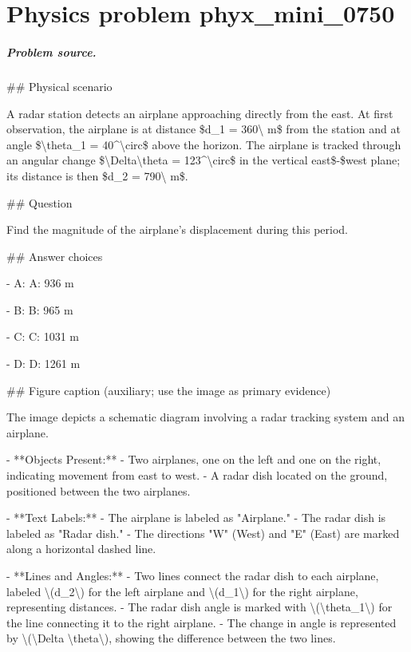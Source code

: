 
\chapter{Physics problem phyx\_mini\_0750}
\label{ch:PhyXMiniProblems_problem_phyx_mini_0750}

\paragraph{Problem source.}
\#\# Physical scenario

A radar station detects an airplane approaching directly from the east. At first observation, the airplane is at distance \$d\_1 = 360\textbackslash{} m\$ from the station and at angle \$\textbackslash{}theta\_1 = 40\textasciicircum{}\textbackslash{}circ\$ above the horizon. The airplane is tracked through an angular change \$\textbackslash{}Delta\textbackslash{}theta = 123\textasciicircum{}\textbackslash{}circ\$ in the vertical east\$-\$west plane; its distance is then \$d\_2 = 790\textbackslash{} m\$.

\#\# Question

Find the magnitude of the airplane's displacement during this period.

\#\# Answer choices

- A: A: 936 m

- B: B: 965 m

- C: C: 1031 m

- D: D: 1261 m

\#\# Figure caption (auxiliary; use the image as primary evidence)

The image depicts a schematic diagram involving a radar tracking system and an airplane. 

- **Objects Present:**
  - Two airplanes, one on the left and one on the right, indicating movement from east to west.
  - A radar dish located on the ground, positioned between the two airplanes.

- **Text Labels:**
  - The airplane is labeled as "Airplane."
  - The radar dish is labeled as "Radar dish."
  - The directions "W" (West) and "E" (East) are marked along a horizontal dashed line.

- **Lines and Angles:**
  - Two lines connect the radar dish to each airplane, labeled \textbackslash{}(d\_2\textbackslash{}) for the left airplane and \textbackslash{}(d\_1\textbackslash{}) for the right airplane, representing distances.
  - The radar dish angle is marked with \textbackslash{}(\textbackslash{}theta\_1\textbackslash{}) for the line connecting it to the right airplane.
  - The change in angle is represented by \textbackslash{}(\textbackslash{}Delta \textbackslash{}theta\textbackslash{}), showing the difference between the two lines.

